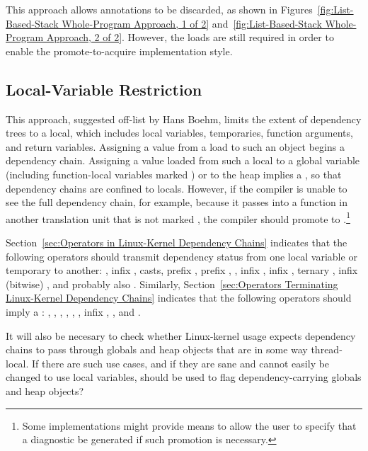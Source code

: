 \documentclass[letterpaper,twocolumn,10pt]{article}
\begin{document}
This approach allows annotations to be discarded, as shown in
Figures~\ref{fig:List-Based-Stack Whole-Program Approach, 1 of 2}
and~\ref{fig:List-Based-Stack Whole-Program Approach, 2 of 2}.
However, the  loads are still required
in order to enable the promote-to-acquire implementation style.

\subsection{Local-Variable Restriction}
\label{sec:Local-Variable Restriction}

This approach, suggested off-list by Hans Boehm, limits the extent of
dependency trees to a local, which includes local variables, temporaries,
function arguments, and return variables.
Assigning a value from a  load to such an
object begins a dependency chain.
Assigning a value loaded from such a local to
a global variable (including function-local variables marked )
or to the heap implies a ,
so that dependency chains are confined to locals.
However, if the compiler is unable to see the full dependency chain,
for example, because it passes into a function in another translation
unit that is not marked , the compiler
should promote  to
.\footnote{
	Some implementations might provide means to allow the user to
	specify that a diagnostic be generated if such promotion is
	necessary.}

Section~\ref{sec:Operators in Linux-Kernel Dependency Chains}
indicates that
the following operators should transmit dependency status from
one local variable or temporary to another:
\co{->}, infix \co{=}, casts, prefix \co{&}, prefix \co{*}, \co{[]},
infix \co{+}, infix \co{-}, ternary , infix (bitwise) \co{&},
and probably also \co{|}.
Similarly,
Section~\ref{sec:Operators Terminating Linux-Kernel Dependency Chains}
indicates that the following operators should imply a
:
\co{()}, \co{!}, \co{==}, \co{!=}, \co{&&}, \co{||}, infix \co{*}, \co{/},
and \co{\%}.

It will also be necesary to check whether Linux-kernel usage expects
dependency chains to pass through globals and heap objects that are
in some way thread-local.
If there are such use cases, and if they are sane and cannot easily
be changed to use local variables, should 
be used to flag dependency-carrying globals and heap objects?
\end{document}

